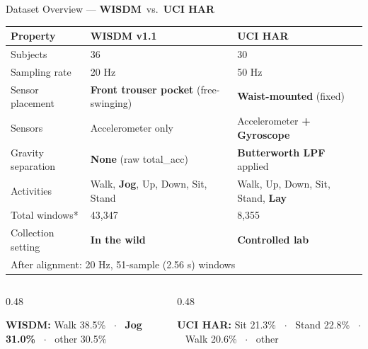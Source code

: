 \documentclass[aspectratio=169, 10pt]{beamer}
\newcommand{\wisdm}{\textcolor{wisdmOrange}{\textbf{WISDM}}}
\newcommand{\uci}{\textcolor{uciBlue}{\textbf{UCI HAR}}}
\begin{document}
\begin{frame}{Dataset Overview — \wisdm\ vs.\ \uci}
  \begin{center}
  \small
  \begin{tabularx}{0.95\textwidth}{lXX}
    \toprule
    \textbf{Property} & \textcolor{wisdmOrange}{\textbf{WISDM v1.1}} & \textcolor{uciBlue}{\textbf{UCI HAR}} \\
    \midrule
    Subjects            & 36                        & 30 \\
    Sampling rate       & 20 Hz                     & 50 Hz \\
    Sensor placement    & \textbf{Front trouser pocket} (free-swinging) & \textbf{Waist-mounted} (fixed) \\
    Sensors             & Accelerometer only        & Accelerometer \textbf{+ Gyroscope} \\
    Gravity separation  & \textbf{None} (raw total\_acc) & \textbf{Butterworth LPF} applied \\
    Activities          & Walk, \textbf{Jog}, Up, Down, Sit, Stand & Walk, Up, Down, Sit, Stand, \textbf{Lay} \\
    Total windows*      & 43,347                    & 8,355 \\
    Collection setting  & \textbf{In the wild}      & \textbf{Controlled lab} \\
    \bottomrule
    \multicolumn{3}{l}{\tiny * After alignment: 20 Hz, 51-sample (2.56 s) windows}
  \end{tabularx}
  \end{center}

  \vspace{3mm}
  \begin{columns}[T]
    \begin{column}{0.48\textwidth}
      \colorbox{wisdmOrange!20}{\parbox{0.97\linewidth}{\small
        \textbf{WISDM:} Walk 38.5\% ~$\cdot$~ \textbf{Jog 31.0\%} ~$\cdot$~ other 30.5\%}}
    \end{column}
    \begin{column}{0.48\textwidth}
      \colorbox{uciBlue!20}{\parbox{0.97\linewidth}{\small
        \textbf{UCI HAR:} Sit 21.3\% ~$\cdot$~ Stand 22.8\% ~$\cdot$~ Walk 20.6\% ~$\cdot$~ other}}
    \end{column}
  \end{columns}
\end{frame}
\end{document}
